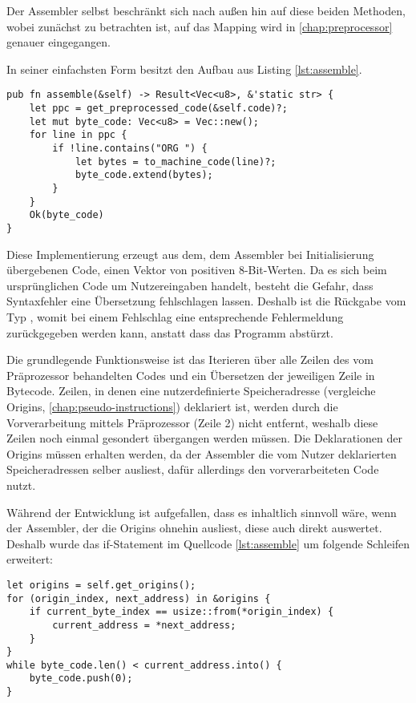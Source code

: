 Der Assembler selbst beschränkt sich nach außen hin auf diese beiden Methoden, wobei zunächst  zu betrachten ist, auf das Mapping wird in \ref{chap:preprocessor} genauer eingegangen.

In seiner einfachsten Form besitzt  den Aufbau aus Listing \ref{lst:assemble}.

\begin{listing}[ht]
\begin{verbatim}
pub fn assemble(&self) -> Result<Vec<u8>, &'static str> {
	let ppc = get_preprocessed_code(&self.code)?;
	let mut byte_code: Vec<u8> = Vec::new();
    for line in ppc {
        if !line.contains("ORG ") {
	        let bytes = to_machine_code(line)?;
            byte_code.extend(bytes);
        }
    }
    Ok(byte_code)
}
\end{verbatim}
\label{lst:assemble}
\end{listing}

Diese Implementierung erzeugt aus dem, dem Assembler bei Initialisierung übergebenen Code, einen Vektor von positiven 8-Bit-Werten. Da es sich beim ursprünglichen Code um Nutzereingaben handelt, besteht die Gefahr, dass Syntaxfehler eine Übersetzung fehlschlagen lassen. Deshalb ist die Rückgabe vom Typ , womit bei einem Fehlschlag eine entsprechende Fehlermeldung zurückgegeben werden kann, anstatt dass das Programm abstürzt.

Die grundlegende Funktionsweise ist das Iterieren über alle Zeilen des vom Präprozessor behandelten Codes und ein Übersetzen der jeweiligen Zeile in Bytecode. Zeilen, in denen eine nutzerdefinierte Speicheradresse (vergleiche Origins, \ref{chap:pseudo-instructions}) deklariert ist, werden durch die Vorverarbeitung mittels Präprozessor (Zeile 2) nicht entfernt, weshalb diese Zeilen noch einmal gesondert übergangen werden müssen. Die Deklarationen der Origins müssen erhalten werden, da der Assembler die vom Nutzer deklarierten Speicheradressen selber ausliest, dafür allerdings den vorverarbeiteten Code nutzt.

Während der Entwicklung ist aufgefallen, dass es inhaltlich sinnvoll wäre, wenn der Assembler, der die Origins ohnehin ausliest, diese auch direkt auswertet. Deshalb wurde das if-Statement im Quellcode \ref{lst:assemble} um folgende Schleifen erweitert:

\begin{listing}[ht]
\begin{verbatim}
let origins = self.get_origins();
for (origin_index, next_address) in &origins {
	if current_byte_index == usize::from(*origin_index) {
        current_address = *next_address;
    }
}
while byte_code.len() < current_address.into() {
    byte_code.push(0);
}
\end{verbatim}
\end{listing}

